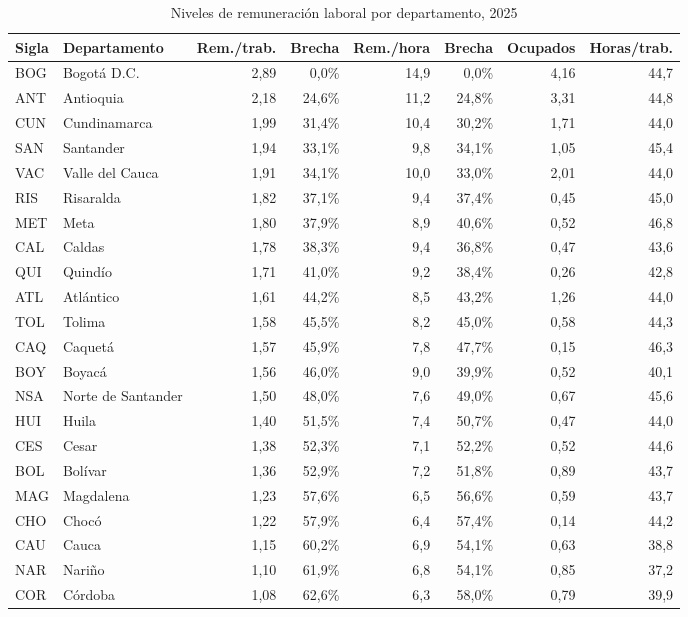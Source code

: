 \begin{table}[H]
\centering
\caption{Niveles de remuneración laboral por departamento, 2025}
\label{tab:dept_remuneracion_niveles_24}
\scriptsize
\begin{tabular}{@{}llrrrrrr@{}}
\toprule
Sigla & Departamento & Rem./trab. & Brecha & Rem./hora & Brecha & Ocupados & Horas/trab. \\
\midrule
BOG & Bogotá D.C. & 2,89 & 0,0\% & 14,9 & 0,0\% & 4,16 & 44,7 \\
ANT & Antioquia & 2,18 & 24,6\% & 11,2 & 24,8\% & 3,31 & 44,8 \\
CUN & Cundinamarca & 1,99 & 31,4\% & 10,4 & 30,2\% & 1,71 & 44,0 \\
SAN & Santander & 1,94 & 33,1\% & 9,8 & 34,1\% & 1,05 & 45,4 \\
VAC & Valle del Cauca & 1,91 & 34,1\% & 10,0 & 33,0\% & 2,01 & 44,0 \\
RIS & Risaralda & 1,82 & 37,1\% & 9,4 & 37,4\% & 0,45 & 45,0 \\
MET & Meta & 1,80 & 37,9\% & 8,9 & 40,6\% & 0,52 & 46,8 \\
CAL & Caldas & 1,78 & 38,3\% & 9,4 & 36,8\% & 0,47 & 43,6 \\
QUI & Quindío & 1,71 & 41,0\% & 9,2 & 38,4\% & 0,26 & 42,8 \\
ATL & Atlántico & 1,61 & 44,2\% & 8,5 & 43,2\% & 1,26 & 44,0 \\
TOL & Tolima & 1,58 & 45,5\% & 8,2 & 45,0\% & 0,58 & 44,3 \\
CAQ & Caquetá & 1,57 & 45,9\% & 7,8 & 47,7\% & 0,15 & 46,3 \\
BOY & Boyacá & 1,56 & 46,0\% & 9,0 & 39,9\% & 0,52 & 40,1 \\
NSA & Norte de Santander & 1,50 & 48,0\% & 7,6 & 49,0\% & 0,67 & 45,6 \\
HUI & Huila & 1,40 & 51,5\% & 7,4 & 50,7\% & 0,47 & 44,0 \\
CES & Cesar & 1,38 & 52,3\% & 7,1 & 52,2\% & 0,52 & 44,6 \\
BOL & Bolívar & 1,36 & 52,9\% & 7,2 & 51,8\% & 0,89 & 43,7 \\
MAG & Magdalena & 1,23 & 57,6\% & 6,5 & 56,6\% & 0,59 & 43,7 \\
CHO & Chocó & 1,22 & 57,9\% & 6,4 & 57,4\% & 0,14 & 44,2 \\
CAU & Cauca & 1,15 & 60,2\% & 6,9 & 54,1\% & 0,63 & 38,8 \\
NAR & Nariño & 1,10 & 61,9\% & 6,8 & 54,1\% & 0,85 & 37,2 \\
COR & Córdoba & 1,08 & 62,6\% & 6,3 & 58,0\% & 0,79 & 39,9 \\

\end{tabular}
\end{table}
